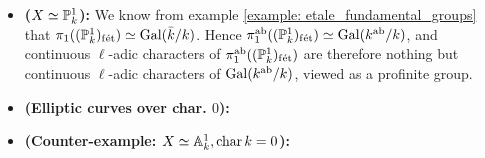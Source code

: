         \begin{example}
            \noindent
            \begin{itemize}
                \item \textbf{($X \cong \P^1_k$):} We know from example \ref{example: etale_fundamental_groups} that $\pi_1((\P^1_k)_{\fet}) \cong \Gal(\bar{k}/k)$. Hence $\pi_1^{\ab}((\P^1_k)_{\fet}) \cong \Gal(k^{\ab}/k)$, and continuous $\ell$-adic characters of $\pi_1^{\ab}((\P^1_k)_{\fet})$ are therefore nothing but continuous $\ell$-adic characters of $\Gal(k^{\ab}/k)$, viewed as a profinite group.
                \item \textbf{(Elliptic curves over char. $0$):}
                \item \textbf{(Counter-example: $X \cong \A^1_k, \chara k = 0$):}
            \end{itemize}
        \end{example}